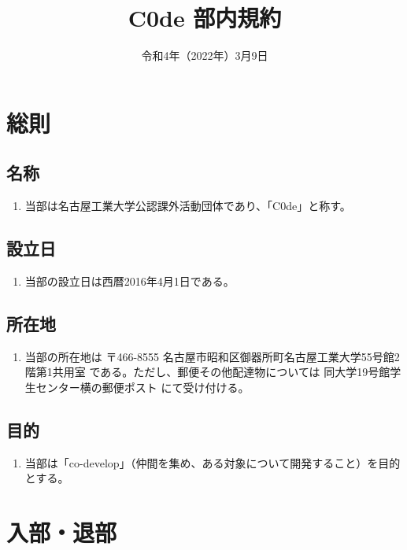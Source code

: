 \documentclass[12pt, unicode, a4paper]{ltjsreport}
\title{C0de 部内規約}
\date{令和4年（2022年）3月9日}
\begin{document}
\maketitle

\tableofcontents

\chapter{総則}
    \section{名称}
        \begin{enumerate}
            \item 当部は名古屋工業大学公認課外活動団体であり、「C0de」と称す。
        \end{enumerate}

    \section{設立日}
        \begin{enumerate}
            \item 当部の設立日は西暦2016年4月1日である。
        \end{enumerate}

    \section{所在地}
        \begin{enumerate}
            \item 当部の所在地は 〒466-8555 名古屋市昭和区御器所町名古屋工業大学55号館2階第1共用室 である。ただし、郵便その他配達物については 同大学19号館学生センター横の郵便ポスト にて受け付ける。
        \end{enumerate}

    \section{目的}\label{purpose}
        \begin{enumerate}
            \item 当部は「co-develop」（仲間を集め、ある対象について開発すること）を目的とする。
        \end{enumerate}


\chapter{入部・退部}
\end{document}
